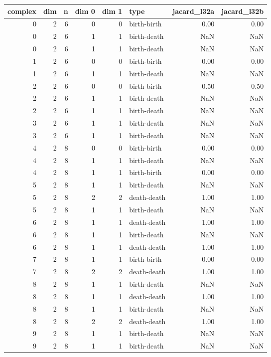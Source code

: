 \documentclass{article}
\begin{document}
\begin{center}
\begin{tabular}{rrrrrlrr}
\toprule
complex & dim & n & dim 0 & dim 1 & type & jacard\_l32a & jacard\_l32b \\
\midrule
0 & 2 & 6 & 0 & 0 & birth-birth & 0.00 & 0.00 \\
0 & 2 & 6 & 1 & 1 & birth-death & NaN & NaN \\
0 & 2 & 6 & 1 & 1 & birth-death & NaN & NaN \\
1 & 2 & 6 & 0 & 0 & birth-birth & 0.00 & 0.00 \\
1 & 2 & 6 & 1 & 1 & birth-death & NaN & NaN \\
2 & 2 & 6 & 0 & 0 & birth-birth & 0.50 & 0.50 \\
2 & 2 & 6 & 1 & 1 & birth-death & NaN & NaN \\
2 & 2 & 6 & 1 & 1 & birth-death & NaN & NaN \\
3 & 2 & 6 & 1 & 1 & birth-death & NaN & NaN \\
3 & 2 & 6 & 1 & 1 & birth-death & NaN & NaN \\
4 & 2 & 8 & 0 & 0 & birth-birth & 0.00 & 0.00 \\
4 & 2 & 8 & 1 & 1 & birth-death & NaN & NaN \\
4 & 2 & 8 & 1 & 1 & birth-birth & 0.00 & 0.00 \\
5 & 2 & 8 & 1 & 1 & birth-death & NaN & NaN \\
5 & 2 & 8 & 2 & 2 & death-death & 1.00 & 1.00 \\
5 & 2 & 8 & 1 & 1 & birth-death & NaN & NaN \\
6 & 2 & 8 & 1 & 1 & death-death & 1.00 & 1.00 \\
6 & 2 & 8 & 1 & 1 & birth-death & NaN & NaN \\
6 & 2 & 8 & 1 & 1 & death-death & 1.00 & 1.00 \\
7 & 2 & 8 & 1 & 1 & birth-birth & 0.00 & 0.00 \\
7 & 2 & 8 & 2 & 2 & death-death & 1.00 & 1.00 \\
8 & 2 & 8 & 1 & 1 & birth-death & NaN & NaN \\
8 & 2 & 8 & 1 & 1 & death-death & 1.00 & 1.00 \\
8 & 2 & 8 & 1 & 1 & birth-death & NaN & NaN \\
8 & 2 & 8 & 2 & 2 & death-death & 1.00 & 1.00 \\
9 & 2 & 8 & 1 & 1 & birth-death & NaN & NaN \\
9 & 2 & 8 & 1 & 1 & birth-death & NaN & NaN \\

\end{tabular}
\end{center}
\end{document}
